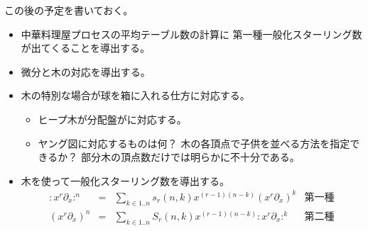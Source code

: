 \begin{todo}[この後]\label{todo:この後} %
\begingroup
	\providecommand{\xdx}[2]{{#1}{#2}\partial_{#1}}
	この後の予定を書いておく。
	\begin{itemize}\setlength{\itemsep}{-1mm} %
		\item 中華料理屋プロセスの平均テーブル数の計算に
		第一種一般化スターリング数が出てくることを導出する。
		\item 微分と木の対応を導出する。
		\item 木の特別な場合が球を箱に入れる仕方に対応する。
		\begin{itemize}\setlength{\itemsep}{-1mm} %
			\item ヒープ木が分配盤がに対応する。
			\item ヤング図に対応するものは何？
			木の各頂点で子供を並べる方法を指定できるか？
			部分木の頂点数だけでは明らかに不十分である。
		\end{itemize} %
		\item 木を使って一般化スターリング数を導出する。
		\begin{equation*}\begin{array}{rcll} %
			:x^r\partial_x:^n &=& \sum_{k\in1..n}s_r(n,k)x^{(r-1)(n-k)}
				(x^r\partial_x)^k & \text{第一種} \\
			(x^r\partial_x)^n &=& \sum_{k\in1..n}S_r(n,k)x^{(r-1)(n-k)}:x^r\partial_x:^k
				& \text{第二種} \\
		\end{array}\end{equation*} %
	\end{itemize} %
\endgroup
\end{todo} %

